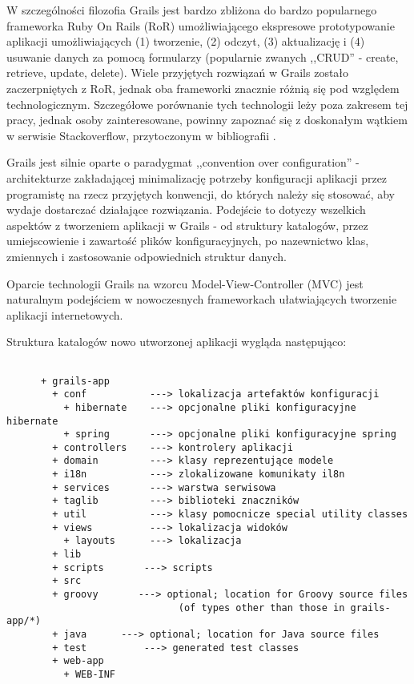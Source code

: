     W szczególności filozofia Grails jest bardzo zbliżona do bardzo popularnego frameworka Ruby On Rails (RoR) umożliwiającego ekspresowe prototypowanie aplikacji umożliwiających (1) tworzenie, (2) odczyt, (3) aktualizację i (4) usuwanie danych za pomocą formularzy (popularnie zwanych ,,CRUD'' - create, retrieve, update, delete). Wiele przyjętych rozwiązań w Grails zostało zaczerpniętych z RoR, jednak oba frameworki znacznie różnią się pod względem technologicznym. Szczegółowe porównanie tych technologii leży poza zakresem tej pracy, jednak osoby zainteresowane, powinny zapoznać się z doskonałym wątkiem w serwisie Stackoverflow, przytoczonym w bibliografii \cite{RailsGr}.


    Grails jest silnie oparte o paradygmat ,,convention over configuration'' - architekturze zakładającej minimalizację potrzeby konfiguracji aplikacji przez programistę na rzecz przyjętych konwencji, do których należy się stosować, aby wydaje dostarczać działające rozwiązania. Podejście to dotyczy wszelkich aspektów z tworzeniem aplikacji w Grails - od struktury katalogów, przez umiejscowienie i zawartość plików konfiguracyjnych, po nazewnictwo klas, zmiennych i zastosowanie odpowiednich struktur danych. 

    Oparcie technologii Grails na wzorcu Model-View-Controller (MVC) jest naturalnym podejściem w nowoczesnych frameworkach ułatwiających tworzenie aplikacji internetowych.

    Struktura katalogów nowo utworzonej aplikacji wygląda następująco:

    \begin{verbatim}

      + grails-app
        + conf           ---> lokalizacja artefaktów konfiguracji
          + hibernate    ---> opcjonalne pliki konfiguracyjne hibernate
          + spring       ---> opcjonalne pliki konfiguracyjne spring 
        + controllers    ---> kontrolery aplikacji
        + domain         ---> klasy reprezentujące modele
        + i18n           ---> zlokalizowane komunikaty il8n
        + services       ---> warstwa serwisowa
        + taglib         ---> biblioteki znaczników
        + util           ---> klasy pomocnicze special utility classes 
        + views          ---> lokalizacja widoków
          + layouts      ---> lokalizacja 
        + lib
        + scripts       ---> scripts
        + src
        + groovy       ---> optional; location for Groovy source files
                              (of types other than those in grails-app/*)
        + java      ---> optional; location for Java source files
        + test          ---> generated test classes
        + web-app
          + WEB-INF

    \end{verbatim}

